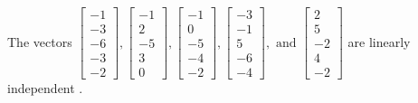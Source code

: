 \begin{exercise}
\begin{exerciseStatement}
  \end{exerciseStatement}
  \begin{exerciseAnswer}
   The vectors \(\left[\begin{array}{r}
-1 \\
-3 \\
-6 \\
-3 \\
-2
\end{array}\right] , \left[\begin{array}{r}
-1 \\
2 \\
-5 \\
3 \\
0
\end{array}\right] , \left[\begin{array}{r}
-1 \\
0 \\
-5 \\
-4 \\
-2
\end{array}\right] , \left[\begin{array}{r}
-3 \\
-1 \\
5 \\
-6 \\
-4
\end{array}\right] , \text{ and } \left[\begin{array}{r}
2 \\
5 \\
-2 \\
4 \\
-2
\end{array}\right]\) are 
  	 linearly independent  .
  


  \end{exerciseAnswer}
\end{exercise}